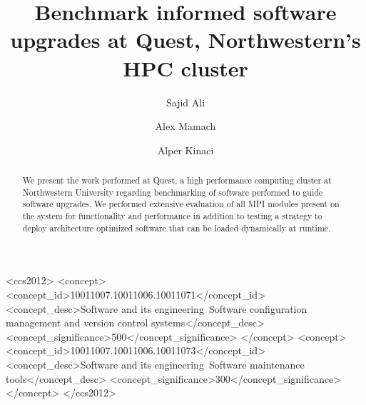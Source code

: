 \documentclass[sigconf,authordraft]{acmart}
\begin{document}
\title{Benchmark informed software upgrades at Quest, Northwestern's HPC cluster}

\author{Sajid Ali}

\author{Alex Mamach}


\author{Alper Kinaci}


\begin{abstract}
  We present the work performed at Quest, a high performance computing cluster at Northwestern University regarding benchmarking of software performed to guide software upgrades. We performed extensive evaluation of all MPI modules present on the system for functionality and performance in addition to testing a strategy to deploy architecture optimized software that can be loaded dynamically at runtime.
\end{abstract}

\begin{CCSXML}
	<ccs2012>
	<concept>
	<concept_id>10011007.10011006.10011071</concept_id>
	<concept_desc>Software and its engineering~Software configuration management and version control systems</concept_desc>
	<concept_significance>500</concept_significance>
	</concept>
	<concept>
	<concept_id>10011007.10011006.10011073</concept_id>
	<concept_desc>Software and its engineering~Software maintenance tools</concept_desc>
	<concept_significance>300</concept_significance>
	</concept>
	</ccs2012>
\end{CCSXML}
\end{document}

